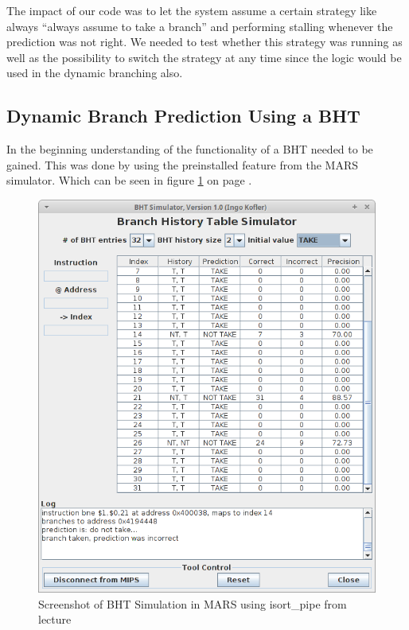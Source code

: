

The impact of our code was to let the system assume a certain strategy like always ``always assume to take a branch'' and performing stalling whenever the prediction was not right. We needed to test whether this strategy was running as well as the possibility to switch the strategy at any time since the logic would be used in the dynamic branching also.


\subsection{Dynamic Branch Prediction Using a BHT}
\label{sec:dynamicBranchPredictionUsingBHT}

In the beginning understanding of the functionality of a BHT needed to be gained. This was done by using the preinstalled feature from the MARS simulator. 
Which can be seen in figure \ref{fig5-1} on page \pageref{fig5-1}.

\begin{figure}
	\centering
  \includegraphics[width=1\textwidth, keepaspectratio]{pictures/task5_BHT_sim_1}
	\caption{Screenshot of BHT Simulation in MARS using isort\_pipe from lecture}
	\label{fig5-1}
\end{figure}

